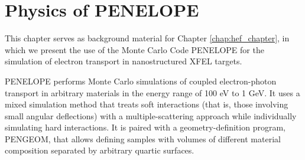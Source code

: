\documentclass [11pt, proquest, article] {uwthesis}[2016/11/22]
\begin{document}
\chapter{Physics of PENELOPE} %
This chapter serves as background material for Chapter \ref{chap:hef_chapter}, in which we present the use of the Monte Carlo Code PENELOPE for the simulation of electron transport in nanostructured XFEL targets. \cite{salvat2008penelope}

\label{Penelope} %




PENELOPE performs Monte Carlo simulations of coupled electron-photon transport in arbitrary materials in the energy range of 100 eV to 1 GeV. It uses a mixed simulation method that treats soft interactions (that is, those involving small angular deflections) with a multiple-scattering approach while individually simulating hard interactions. It is paired with a geometry-definition program, PENGEOM, that allows defining samples with volumes of different material composition separated by arbitrary quartic surfaces. \cite{almansa2016pengeom}
\end{document}
